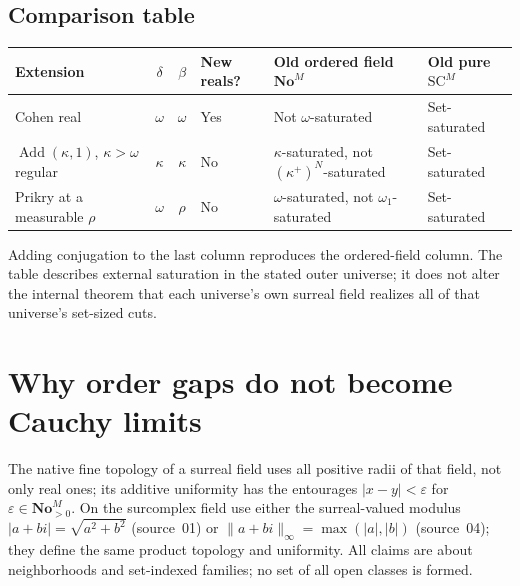 \documentclass[11pt,letterpaper]{article}
\numberwithin{equation}{section}
\theoremstyle{definition}
\theoremstyle{remark}
\newcommand{\No}{\mathbf{No}}
\newcommand{\SC}{\mathrm{SC}}
\newcommand{\NoM}{\No^{M}}
\newcommand{\SCM}{\SC^{M}}
\newcommand{\Add}{\operatorname{Add}}
\newcommand{\abs}[1]{\lvert#1\rvert}
\begin{document}
\subsection{Comparison table}

\begin{center}\small
\begin{tabular}{@{}P{0.25\textwidth}ccP{0.11\textwidth}P{0.22\textwidth}P{0.14\textwidth}@{}}
\toprule
Extension & $\delta$ & $\beta$ & New reals? & Old ordered field $\NoM$ & Old pure $\SCM$\\
\midrule
Cohen real & $\omega$ & $\omega$ & Yes & Not $\omega$-saturated & Set-saturated\\[3pt]
$\Add(\kappa,1)$, $\kappa>\omega$ regular & $\kappa$ & $\kappa$ & No & $\kappa$-saturated, not $(\kappa^+)^N$-saturated & Set-saturated\\[3pt]
Prikry at a measurable $\rho$ & $\omega$ & $\rho$ & No & $\omega$-saturated, not $\omega_1$-saturated & Set-saturated\\
\bottomrule
\end{tabular}
\end{center}
Adding conjugation to the last column reproduces the ordered-field column. The
table describes external saturation in the stated outer universe; it does not
alter the internal theorem that each universe's own surreal field realizes all
of that universe's set-sized cuts.

\section{Why order gaps do not become Cauchy limits}\label{univ:sec:topology}

The native fine topology of a surreal field uses all positive radii of that
field, not only real ones; its additive uniformity has the entourages
$\abs{x-y}<\varepsilon$ for $\varepsilon\in\NoM_{>0}$. On the surcomplex field
use either the surreal-valued modulus $\abs{a+bi}=\sqrt{a^2+b^2}$ (source~01)
or $\|a+bi\|_\infty=\max(\abs a,\abs b)$ (source~04); they define the same
product topology and uniformity. All claims are about neighborhoods and
set-indexed families; no set of all open classes is formed.
\end{document}
